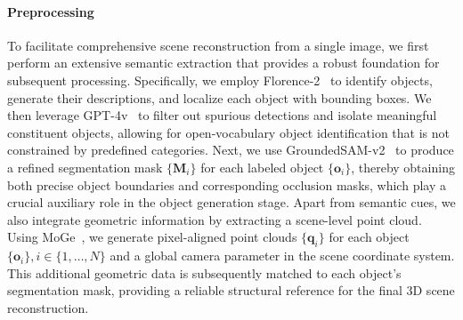 \paragraph{Preprocessing}
To facilitate comprehensive scene reconstruction from a single image, we first perform an extensive semantic extraction that provides a robust foundation for subsequent processing. Specifically, we employ Florence-2~\cite{xiao2024florence} to identify objects, generate their descriptions, and localize each object with bounding boxes. We then leverage GPT-4v~\cite{achiam2023gpt} to filter out spurious detections and isolate meaningful constituent objects, allowing for open-vocabulary object identification that is not constrained by predefined categories. Next, we use GroundedSAM-v2~\cite{ren2024grounded} to produce a refined segmentation mask $\{ \bm{M}_i \}$ for each labeled object $\{ \bm{o}_i \}$, thereby obtaining both precise object boundaries and corresponding occlusion masks, which play a crucial auxiliary role in the object generation stage.
Apart from semantic cues, we also integrate geometric information by extracting a scene-level point cloud. Using MoGe~\cite{wang2024moge}, we generate pixel-aligned point clouds $\{ \bm{q}_i \}$ for each object $\{ \bm{o}_i \}, i \in \{1,\dots,N\}$ and a global camera parameter in the scene coordinate system. This additional geometric data is subsequently matched to each object’s segmentation mask, providing a reliable structural reference for the final 3D scene reconstruction.

